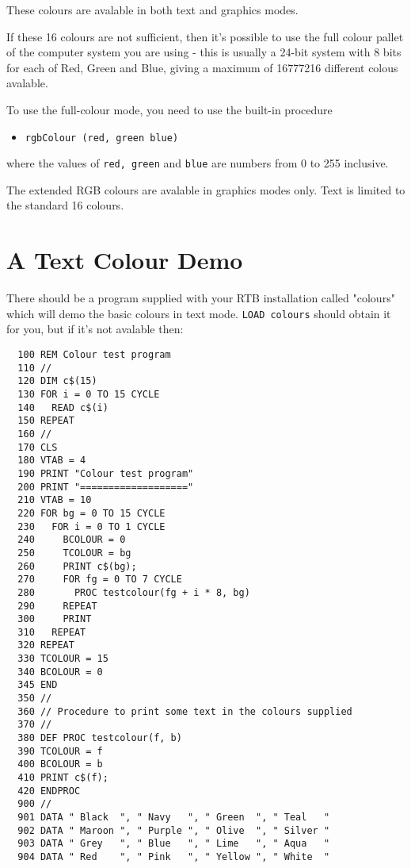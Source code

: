 These colours are avalable in both text and graphics modes.

If these 16 colours are not sufficient, then it's possible to use
the full colour pallet of the computer system you are using - this is
usually a 24-bit system with 8 bits for each of Red, Green and Blue,
giving a maximum of 16777216 different colous avalable.

To use the full-colour mode, you need to use the built-in procedure
\begin{itemize}
\item {\tt rgbColour (red, green blue)}
\end{itemize}
where the values of {\tt red, green} and {\tt blue} are numbers from 0
to 255 inclusive.

The extended RGB colours are avalable in graphics modes only. Text is
limited to the standard 16 colours.

\section{A Text Colour Demo}
There should be a program supplied with your RTB installation called
"colours" which will demo the basic colours in text mode. {\tt LOAD
colours} should obtain it for you, but if it's not avalable then:
\begin{samepage}
\begin{verbatim}
  100 REM Colour test program
  110 //
  120 DIM c$(15)
  130 FOR i = 0 TO 15 CYCLE 
  140   READ c$(i)
  150 REPEAT 
  160 //
  170 CLS 
  180 VTAB = 4
  190 PRINT "Colour test program"
  200 PRINT "==================="
  210 VTAB = 10
  220 FOR bg = 0 TO 15 CYCLE 
  230   FOR i = 0 TO 1 CYCLE 
  240     BCOLOUR = 0
  250     TCOLOUR = bg
  260     PRINT c$(bg);  
  270     FOR fg = 0 TO 7 CYCLE 
  280       PROC testcolour(fg + i * 8, bg)
  290     REPEAT 
  300     PRINT 
  310   REPEAT 
  320 REPEAT 
  330 TCOLOUR = 15
  340 BCOLOUR = 0
  345 END 
  350 //
  360 // Procedure to print some text in the colours supplied
  370 //
  380 DEF PROC testcolour(f, b)
  390 TCOLOUR = f
  400 BCOLOUR = b
  410 PRINT c$(f);  
  420 ENDPROC 
  900 //
  901 DATA " Black  ", " Navy   ", " Green  ", " Teal   "
  902 DATA " Maroon ", " Purple ", " Olive  ", " Silver "
  903 DATA " Grey   ", " Blue   ", " Lime   ", " Aqua   "
  904 DATA " Red    ", " Pink   ", " Yellow ", " White  "
\end{verbatim}
\end{samepage}
